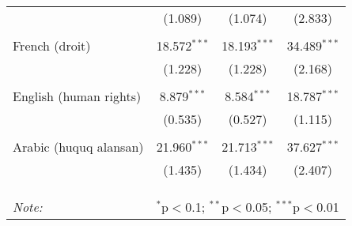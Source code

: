 \begin{table}[!htbp]
\begin{tabular}{@{\extracolsep{5pt}}lccc}
  & (1.089) & (1.074) & (2.833) \\ 
  & & & \\ 
 French (droit) & 18.572$^{***}$ & 18.193$^{***}$ & 34.489$^{***}$ \\ 
  & (1.228) & (1.228) & (2.168) \\ 
  & & & \\ 
 English (human rights) & 8.879$^{***}$ & 8.584$^{***}$ & 18.787$^{***}$ \\ 
  & (0.535) & (0.527) & (1.115) \\ 
  & & & \\ 
 Arabic (huquq alansan) & 21.960$^{***}$ & 21.713$^{***}$ & 37.627$^{***}$ \\ 
  & (1.435) & (1.434) & (2.407) \\ 
  & & & \\ 
\hline \\[-1.8ex] 
\hline 
\hline \\[-1.8ex] 
\textit{Note:}  & \multicolumn{3}{r}{$^{*}$p$<$0.1; $^{**}$p$<$0.05; $^{***}$p$<$0.01} \\ 
\end{tabular} 
\end{table} 
